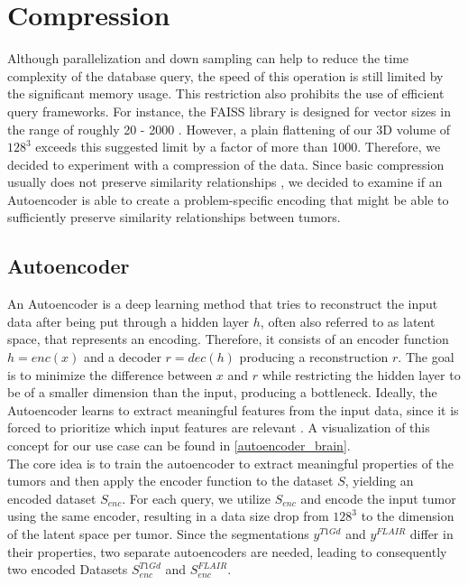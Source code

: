 
\section{Compression}
Although parallelization and down sampling can help to reduce the time complexity of the database query, the speed of this operation is still limited by the significant memory usage. This restriction also prohibits the use of efficient query frameworks. For instance, the FAISS library is designed for vector sizes in the range of roughly 20 - 2000 \parencite{FAISS}. However, a plain flattening of our 3D volume of $128^3$ exceeds this suggested limit by a factor of more than 1000. Therefore, we decided to experiment with a compression of the data. Since basic compression usually does not preserve similarity relationships ,  we decided to examine if an Autoencoder is able to create a problem-specific encoding that might be able to sufficiently preserve similarity relationships between tumors.

\subsection{Autoencoder}\label{autoencoder}
An Autoencoder is a deep learning method that tries to reconstruct the input data after being put through a hidden layer $h$, often also referred to as latent space, that represents an encoding. Therefore, it consists of an encoder function $h=enc(x)$ and a decoder $r = dec(h)$ producing a reconstruction $r$. The goal is to minimize the difference between $x$ and $r$ while restricting the hidden layer to be of a smaller dimension than the input, producing a bottleneck. Ideally, the Autoencoder learns to extract meaningful features from the input data, since it is forced to prioritize which input features are relevant \parencite{Goodfellow-et-al-2016}.
A visualization of this concept for our use case can be found in \autoref{autoencoder_brain}.\\
The core idea is to train the autoencoder to extract meaningful properties of the tumors and then apply the encoder
function to the dataset $S$, yielding an encoded dataset $S_{enc}$.
For each query, we utilize $S_{enc}$ and encode the input tumor using the same encoder, resulting in a data size drop from $128^3$ to the dimension of the latent space per tumor. Since the segmentations $y^{T1Gd}$ and $y^{FLAIR}$ differ in their properties, two separate autoencoders are needed, leading to consequently two encoded Datasets $S_{enc}^{T1Gd}$ and $S_{enc}^{FLAIR}$.

